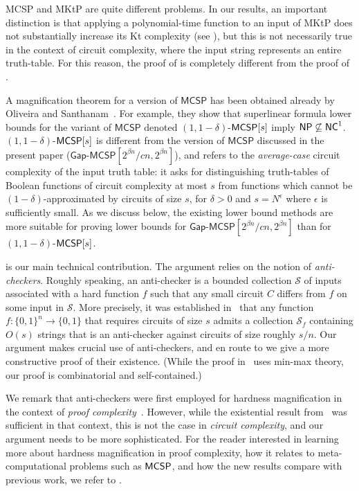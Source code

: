 \documentclass{toc}
\newcommand{\NC}{\ensuremath{{\sf NC}^1}\xspace}
\newcommand{\NP}{\ensuremath{{\sf NP}}\xspace}
\newcommand{\MCSP}{\ensuremath{{\sf MCSP}}\xspace}
\newcommand{\gapmcsp}{\mathsf{Gap}$-$\mathsf{MCSP}}
\begin{document}
\vspace{0.2cm}

MCSP and MKtP are quite different problems. In our results, an important distinction is that applying a polynomial-time function to an input of MKtP does not substantially increase its Kt complexity (see ), but this is not necessarily true in the context of circuit complexity, where the input string represents an entire truth-table. For this reason, the proof of  is completely different from the proof of . 

A magnification theorem for a version of $\mathsf{MCSP}$ has been obtained already by Oliveira and Santhanam~\cite{OS18}. For example, they show that superlinear formula lower bounds for the variant of $\mathsf{MCSP}$ denoted $(1,1-\delta)$-$\MCSP[s]$ imply $\NP\not\subseteq\NC$. $(1,1-\delta)$-$\MCSP[s]$ is different from the version of $\mathsf{MCSP}$ discussed in
%
the present paper %
($\gapmcsp[2^{\beta n}/cn, 2^{\beta n}]$), and refers to the \emph{average-case} circuit complexity of the input truth table: it asks for distinguishing truth-tables of Boolean functions of circuit complexity at most $s$ from functions which cannot be $(1-\delta)$-approximated by circuits of size $s$, for $\delta>0$ and $s=N^{\epsilon}$ where $\epsilon$ is sufficiently small. As we discuss below, the existing lower bound methods are more suitable for proving lower bounds for $\gapmcsp[2^{\beta n}/cn, 2^{\beta n}]$ than for $(1,1-\delta)$-$\MCSP[s]$.


 is our main technical contribution.  The argument relies on the notion of \emph{anti-checkers}. Roughly speaking, an anti-checker is a bounded collection $\mathcal{S}$ of inputs associated with a hard function $f$ such that any small circuit $C$ differs from $f$ on some input in $\mathcal{S}$. More precisely, it was established in~\cite{DBLP:conf/stoc/LiptonY94} that any function $f \colon \{0,1\}^n \to \{0,1\}$ that requires circuits of size $s$ admits a collection $\mathcal{S}_f$ containing $O(s)$ strings that is an anti-checker against circuits of size roughly $s/n$. Our argument makes crucial use of anti-checkers, 
and en route to  we give a more constructive proof of their existence. (While the proof in~\cite{DBLP:conf/stoc/LiptonY94} uses min-max theory, our proof is combinatorial and self-contained.) 

We remark that anti-checkers were first employed for hardness magnification in the context of \emph{proof complexity}~\cite{DBLP:journals/eccc/MullerP17}. However, while the existential result from~\cite{DBLP:conf/stoc/LiptonY94} was sufficient in that context, this is not the case in \emph{circuit complexity}, and our argument needs to be more sophisticated. For the reader interested in learning more about hardness magnification in proof complexity, how it relates to meta-computational problems such as \MCSP, and how the new results compare with previous work, we refer to .
\end{document}
